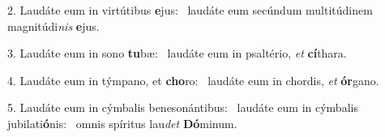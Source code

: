 2. Laudáte eum in virtútibus \textbf{e}jus: \ast\  laudáte eum secúndum multitúdinem magnitúdi\textit{nis} \textbf{e}jus.\

3. Laudáte eum in sono \textbf{tu}bæ: \ast\  laudáte eum in psaltério, \textit{et} \textbf{cí}thara.\

4. Laudáte eum in týmpano, et \textbf{cho}ro: \ast\  laudáte eum in chordis, \textit{et} \textbf{ór}gano.\

5. Laudáte eum in cýmbalis benesonántibus: \dag\  laudáte eum in cýmbalis jubilati\textbf{ó}nis: \ast\  omnis spíritus lau\textit{det} \textbf{Dó}minum.\

